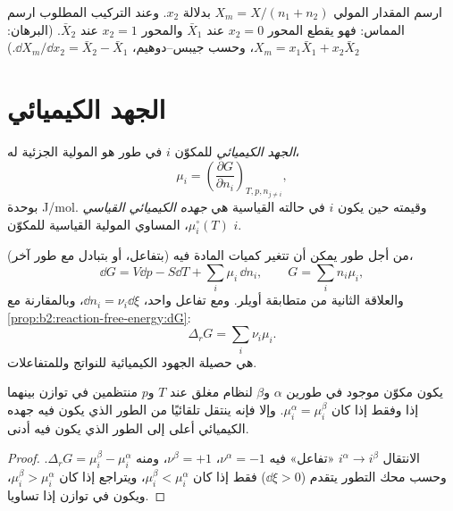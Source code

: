 \begin{method}\label{met:b2:chemical-potential:tangent}
ارسم المقدار المولي $X_m = X/(n_1 + n_2)$ بدلالة $x_2$. وعند التركيب
المطلوب ارسم المماس: فهو يقطع المحور $x_2 = 0$ عند
$\bar X_1$ والمحور $x_2 = 1$ عند $\bar X_2$. (البرهان: $X_m = x_1\bar X_1 +
x_2\bar X_2$، وحسب جيبس--دوهيم، $\dd X_m/\dd x_2 = \bar X_2 - \bar X_1$.)
\end{method}

\section{الجهد الكيميائي}

\begin{definition}\label{def:b2:chemical-potential:chemical-potential}
\emph{الجهد الكيميائي} للمكوّن $i$ في
طور هو  المولية الجزئية له،
\[
  \mu_i = \left(\frac{\partial G}{\partial n_i}\right)_{T, p, n_{j\ne i}} ,
\]
بوحدة \unit{J/mol}. وقيمته حين يكون $i$ في حالته القياسية هي
\emph{جهده الكيميائي القياسي}
$\mu_i^\circ(T)$، المساوي  المولية القياسية للمكوّن $i$.
\end{definition}

من أجل طور يمكن أن تتغير كميات المادة فيه (بتفاعل، أو بتبادل مع طور
آخر)،
\[
  \dd G = V\dd p - S\dd T + \sum_i\mu_i\,\dd n_i ,\qquad G = \sum_i n_i\mu_i ,
\]
والعلاقة الثانية من متطابقة أويلر. ومع تفاعل واحد، $\dd n_i =
\nu_i\dd\xi$، وبالمقارنة مع \cref{prop:b2:reaction-free-energy:dG}:
\[
  \Delta_r G = \sum_i\nu_i\mu_i .
\]
 هي حصيلة الجهود الكيميائية للنواتج
وللمتفاعلات.

\begin{theorem}\label{thm:b2:chemical-potential:phase-equilibrium}
يكون مكوّن موجود في طورين $\alpha$ و$\beta$ لنظام مغلق عند $T$ و$p$
منتظمين في توازن بينهما إذا وفقط إذا كان
$\mu_i^\alpha = \mu_i^\beta$. وإلا فإنه ينتقل تلقائيًا من الطور الذي يكون
فيه جهده الكيميائي أعلى إلى الطور الذي يكون فيه أدنى.
\end{theorem}

\begin{proof}
الانتقال $i^\alpha \to i^\beta$ «تفاعل» فيه $\nu^\alpha = -1$،
$\nu^\beta = +1$، ومنه $\Delta_r G = \mu_i^\beta - \mu_i^\alpha$. وحسب
محك التطور يتقدم ($\dd\xi > 0$) فقط إذا كان $\mu_i^\beta <
\mu_i^\alpha$، ويتراجع إذا كان $\mu_i^\beta > \mu_i^\alpha$، ويكون في
توازن إذا تساويا.
\end{proof}


